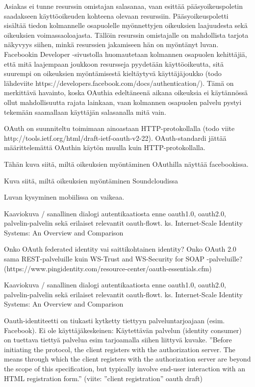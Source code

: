 \documentclass[finnish,gradu]{tktltiki}
\begin{document}
  Asiakas ei tunne resurssin omistajan salasanaa, vaan esittää pääsyoikeuspoletin saadakseen käyttöoikeuden kohteena olevaan resurssiin. Pääsyoikeuspoletti sisältää tiedon kolmannelle osapuolelle myönnettyjen oikeuksien laajuudesta sekä oikeuksien voimassaoloajasta. Tällöin resurssin omistajalle on mahdollista tarjota näkyvyys siihen, minkä resurssien jakamiseen hän on myöntänyt luvan. Facebookin Developer -sivustolla huomautetaan kolmannen osapuolen kehittäjiä, että mitä laajempaan joukkoon resursseja pyydetään käyttöoikeutta, sitä suurempi on oikeuksien myöntämisestä kieltäytyvä käyttäjäjoukko (todo lähdeviite https://developers.facebook.com/docs/authentication/). Tämä on merkittävä havainto, koska OAuthia edeltäneenä aikana oikeuksia ei käytännössä ollut mahdollisuutta rajata lainkaan, vaan kolmannen osapuolen palvelu pystyi tekemään saamallaan käyttäjän salasanalla mitä vain.

  OAuth on suunniteltu toimimaan ainoastaan HTTP-protokollalla (todo viite http://tools.ietf.org/html/draft-ietf-oauth-v2-22).
  OAuth-standardi jättää määrittelemättä OAuthin käytön muulla kuin HTTP-protokollalla.

  Tähän kuva siitä, miltä oikeuksien myöntäminen OAuthilla näyttää facebookissa.

  Kuva siitä, miltä oikeuksien myöntäminen Soundcloudissa %


  Luvan kysyminen mobiilissa on vaikeaa.

  Kaaviokuva / sanallinen dialogi autentikaatiosta enne oauth1.0, oauth2.0, palvelin-palvelin sekä erilaiset relevantit oauth-flowt.
  ks. Internet-Scale Identity Systems: An Overview and Comparison

  Onko OAuth federated identity vai saittikohtainen identity?
  Onko OAuth 2.0 sama REST-palveluille kuin WS-Trust and WS-Security for SOAP -palveluille? (https://www.pingidentity.com/resource-center/oauth-essentials.cfm)

  Kaaviokuva / sanallinen dialogi autentikaatiosta enne oauth1.0, oauth2.0, palvelin-palvelin sekä erilaiset relevantit oauth-flowt.
  ks. Internet-Scale Identity Systems: An Overview and Comparison

  Oauth-identiteetti on tiukasti kytketty tiettyyn palveluntarjoajaan (esim. Facebook).
  Ei ole käyttäjäkeskeinen: Käytettävän palvelun (identity consumer) on tuettava tiettyä palvelua esim tarjoamalla siihen liittyvä kuvake.
  ''Before initiating the protocol, the client registers with the authorization server. The means through which the client registers with the authorization
  server are beyond the scope of this specification, but typically involve end-user interaction with an HTML registration form.'' (viite: ''client registration'' oauth draft)
\end{document}
